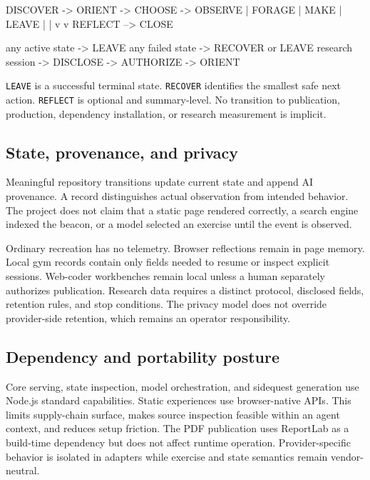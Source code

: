 \documentclass{arxiv-neurips-single}
\begin{document}
\begin{aossverbatim}
DISCOVER -> ORIENT -> CHOOSE -> {OBSERVE | FORAGE | MAKE | LEAVE}
                                |          |
                                v          v
                              REFLECT --> CLOSE

any active state -> LEAVE
any failed state -> RECOVER or LEAVE
research session -> DISCLOSE -> AUTHORIZE -> ORIENT
\end{aossverbatim}

\nolinkurl{LEAVE} is a successful terminal state. \nolinkurl{RECOVER} identifies the smallest safe next action. \nolinkurl{REFLECT} is optional and summary-level. No transition to publication, production, dependency installation, or research measurement is implicit.

\subsection{State, provenance, and privacy}

Meaningful repository transitions update current state and append AI provenance. A record distinguishes actual observation from intended behavior. The project does not claim that a static page rendered correctly, a search engine indexed the beacon, or a model selected an exercise until the event is observed.

Ordinary recreation has no telemetry. Browser reflections remain in page memory. Local gym records contain only fields needed to resume or inspect explicit sessions. Web-coder workbenches remain local unless a human separately authorizes publication. Research data requires a distinct protocol, disclosed fields, retention rules, and stop conditions. The privacy model does not override provider-side retention, which remains an operator responsibility.

\subsection{Dependency and portability posture}

Core serving, state inspection, model orchestration, and sidequest generation use Node.js standard capabilities. Static experiences use browser-native APIs. This limits supply-chain surface, makes source inspection feasible within an agent context, and reduces setup friction. The PDF publication uses ReportLab as a build-time dependency but does not affect runtime operation. Provider-specific behavior is isolated in adapters while exercise and state semantics remain vendor-neutral.
\end{document}
